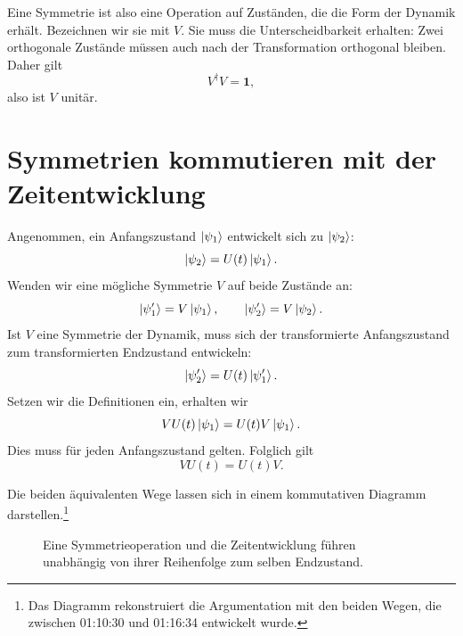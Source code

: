 Eine Symmetrie ist also eine Operation auf Zuständen, die die Form der Dynamik erhält. Bezeichnen wir sie mit \(V\). Sie muss die Unterscheidbarkeit erhalten: Zwei orthogonale Zustände müssen auch nach der Transformation orthogonal bleiben. Daher gilt
\begin{equation}
V^\dagger V=\mathbf 1,
\end{equation}
also ist \(V\) unitär.

\section{Symmetrien kommutieren mit der Zeitentwicklung}

Angenommen, ein Anfangszustand \(\left\lvert\psi_1\right\rangle\) entwickelt sich zu \(\left\lvert\psi_2\right\rangle\):
\begin{equation}
\left\lvert\psi_2\right\rangle=U(t)\left\lvert\psi_1\right\rangle.
\end{equation}
Wenden wir eine mögliche Symmetrie \(V\) auf beide Zustände an:
\begin{equation}
\left\lvert\psi_1'\right\rangle=V\left\lvert\psi_1\right\rangle,
\qquad
\left\lvert\psi_2'\right\rangle=V\left\lvert\psi_2\right\rangle.
\end{equation}
Ist \(V\) eine Symmetrie der Dynamik, muss sich der transformierte Anfangszustand zum transformierten Endzustand entwickeln:
\begin{equation}
\left\lvert\psi_2'\right\rangle=U(t)\left\lvert\psi_1'\right\rangle.
\end{equation}
Setzen wir die Definitionen ein, erhalten wir
\begin{equation}
VU(t)\left\lvert\psi_1\right\rangle
=
U(t)V\left\lvert\psi_1\right\rangle.
\end{equation}
Dies muss für jeden Anfangszustand gelten. Folglich gilt
\begin{equation}
VU(t)=U(t)V.
\end{equation}

Die beiden äquivalenten Wege lassen sich in einem kommutativen Diagramm darstellen.\footnote{Das Diagramm rekonstruiert die Argumentation mit den beiden Wegen, die zwischen 01:10:30 und 01:16:34 entwickelt wurde.}
\begin{figure}
\centering
{}
\caption{Eine Symmetrieoperation und die Zeitentwicklung führen unabhängig von ihrer Reihenfolge zum selben Endzustand.}
\end{figure}

